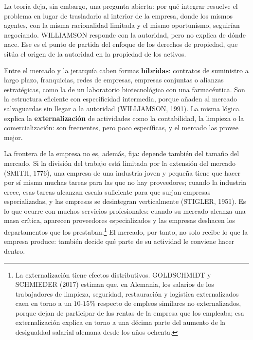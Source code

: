 \documentclass[10pt,a4paper]{article}
\begin{document}
La teoría deja, sin embargo, una pregunta abierta: por qué integrar resuelve el problema en lugar de trasladarlo al interior de la empresa, donde los mismos agentes, con la misma racionalidad limitada y el mismo oportunismo, seguirían negociando. WILLIAMSON responde con la autoridad, pero no explica de dónde nace. Ese es el punto de partida del enfoque de los derechos de propiedad, que sitúa el origen de la autoridad en la propiedad de los activos.


Entre el mercado y la jerarquía caben formas \textbf{híbridas}: contratos de suministro a largo plazo, franquicias, redes de empresas, empresas conjuntas o alianzas estratégicas, como la de un laboratorio biotecnológico con una farmacéutica. Son la estructura eficiente con especificidad intermedia, porque añaden al mercado salvaguardas sin llegar a la autoridad (WILLIAMSON, 1991). La misma lógica explica la \textbf{externalización} de actividades como la contabilidad, la limpieza o la comercialización: son frecuentes, pero poco específicas, y el mercado las provee mejor.

La frontera de la empresa no es, además, fija: depende también del tamaño del mercado. Si la división del trabajo está limitada por la extensión del mercado (SMITH, 1776), una empresa de una industria joven y pequeña tiene que hacer por sí misma muchas tareas para las que no hay proveedores; cuando la industria crece, esas tareas alcanzan escala suficiente para que surjan empresas especializadas, y las empresas se desintegran verticalmente (STIGLER, 1951). Es lo que ocurre con muchos servicios profesionales: cuando su mercado alcanza una masa crítica, aparecen proveedores especializados y las empresas deshacen los departamentos que los prestaban.\footnote{%
    La externalización tiene efectos distributivos. GOLDSCHMIDT y SCHMIEDER (2017) estiman que, en Alemania, los salarios de los trabajadores de limpieza, seguridad, restauración y logística externalizados caen en torno a un $10$-$15\%$ respecto de empleos similares no externalizados, porque dejan de participar de las rentas de la empresa que los empleaba; esa externalización explica en torno a una décima parte del aumento de la desigualdad salarial alemana desde los años ochenta.
} El mercado, por tanto, no solo recibe lo que la empresa produce: también decide qué parte de su actividad le conviene hacer dentro.
\end{document}
